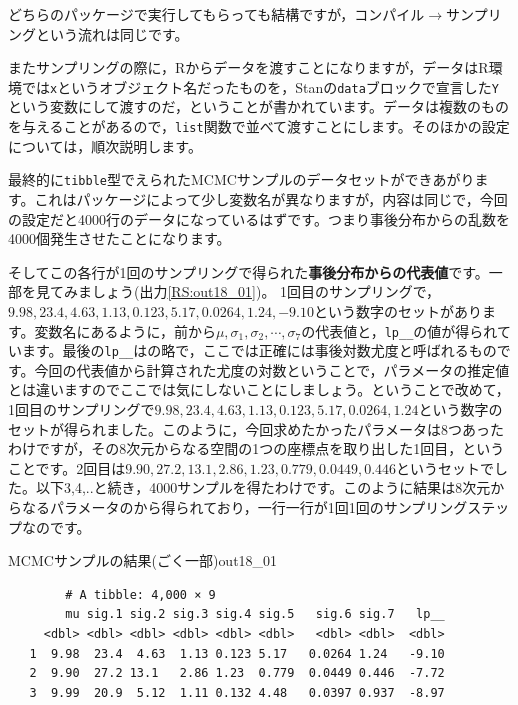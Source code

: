 \documentclass{ltjsbook}
\begin{document}
どちらのパッケージで実行してもらっても結構ですが，コンパイル$\to$サンプリングという流れは同じです。

またサンプリングの際に，Rからデータを渡すことになりますが，データはR環境では\texttt{x}というオブジェクト名だったものを，Stanの\texttt{data}ブロックで宣言した\texttt{Y}という変数にして渡すのだ，ということが書かれています。データは複数のものを与えることがあるので，\texttt{list}関数で並べて渡すことにします。そのほかの設定については，順次説明します。

最終的に\verb|tibble|型でえられたMCMCサンプルのデータセットができあがります。これはパッケージによって少し変数名が異なりますが，内容は同じで，今回の設定だと4000行のデータになっているはずです。つまり事後分布からの乱数を4000個発生させたことになります。

そしてこの各行が1回のサンプリングで得られた\textbf{事後分布からの代表値}です。一部を見てみましょう(出力\ref{RS:out18_01})。
1回目のサンプリングで，$9.98,23.4,4.63,1.13,0.123,5.17,0.0264,1.24,-9.10$という数字のセットがあります。変数名にあるように，前から$\mu, \sigma_1,\sigma_2,\cdots,\sigma_7$の代表値と，\verb|lp__|の値が得られています。最後の\verb|lp__|はの略で，ここでは正確には事後対数尤度と呼ばれるものです。今回の代表値から計算された尤度の対数ということで，パラメータの推定値とは違いますのでここでは気にしないことにしましょう。ということで改めて，1回目のサンプリングで$9.98,23.4,4.63,1.13,0.123,5.17,0.0264,1.24$という数字のセットが得られました。このように，今回求めたかったパラメータは8つあったわけですが，その8次元からなる空間の1つの座標点を取り出した1回目，ということです。2回目は$9.90,27.2,13.1,2.86,1.23,0.779,0.0449,0.446$というセットでした。以下3,4,..と続き，4000サンプルを得たわけです。このように結果は8次元からなるパラメータのから得られており，一行一行が1回1回のサンプリングステップなのです。

\begin{Rscreen}{MCMCサンプルの結果(ごく一部)}{out18_01}
	\begin{verbatim}
        # A tibble: 4,000 × 9
        mu sig.1 sig.2 sig.3 sig.4 sig.5   sig.6 sig.7   lp__
     <dbl> <dbl> <dbl> <dbl> <dbl> <dbl>   <dbl> <dbl>  <dbl>
   1  9.98  23.4  4.63  1.13 0.123 5.17   0.0264 1.24   -9.10
   2  9.90  27.2 13.1   2.86 1.23  0.779  0.0449 0.446  -7.72
   3  9.99  20.9  5.12  1.11 0.132 4.48   0.0397 0.937  -8.97
\end{verbatim}
\end{Rscreen}
\end{document}

